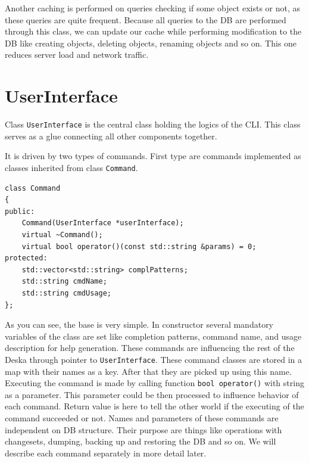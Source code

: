 \documentclass[deska]{subfiles}
\begin{document}
Another caching is performed on queries checking if some object exists or not, as these queries are quite frequent.
Because all queries to the DB are performed through this class, we can update our cache while performing modification to
the DB like creating objects, deleting objects, renaming objects and so on. This one reduces server load and network traffic.

\section{UserInterface}

Class {\tt UserInterface} is the central class holding the logics of the CLI. This class serves as a glue connecting
all other components together.

It is driven by two types of commands. First type are commands implemented as classes inherited from class {\tt Command}.

\begin{verbatim}
class Command
{
public:
    Command(UserInterface *userInterface);
    virtual ~Command();
    virtual bool operator()(const std::string &params) = 0;
protected:
    std::vector<std::string> complPatterns;
    std::string cmdName;
    std::string cmdUsage;
};
\end{verbatim}

As you can see, the base is very simple. In constructor several mandatory variables of the class are set like
completion patterns, command name, and usage description for help generation. These commands are influencing the rest of
the Deska through pointer to {\tt UserInterface}. These command classes are stored in a map with their names as a key.
After that they are picked up using this name. Executing the command is made by calling function {\tt bool operator()} with
string as a parameter. This parameter could be then processed to influence behavior of each command. Return value is here
to tell the other world if the executing of the command succeeded or not. Names and parameters of these commands
are independent on DB structure. Their purpose are things like operations with changesets, dumping, backing up and restoring
the DB and so on. We will describe each command separately in more detail later.
\end{document}

